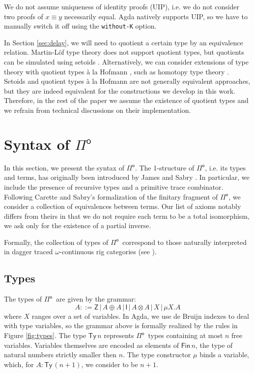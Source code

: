 \documentclass[runningheads,a4paper]{llncs}
\newcommand{\Pio}{\ensuremath{\mathsf{\Pi}^{\mathsf{o}}}}
\newcommand{\Ty}{\mathsf{Ty}}
\newcommand{\Z}{\mathsf{Z}}
\newcommand{\I}{\mathsf{I}}
\begin{document}
We do not assume uniqueness of identity proofs
(UIP), i.e. we do not consider two proofs of $x \equiv y$ necessarily
equal. Agda natively supports UIP, so we have to manually switch it
off using the \verb|without-K| option.

In Section \ref{sec:delay}, we will need to quotient a certain type by
an equivalence relation. Martin-L\"of type theory does not support
quotient types, but quotients can be simulated using setoids
\cite{BartheCP03}. Alternatively, we can consider extensions of type theory with
quotient types \`a la Hofmann \cite{Hofmann}, such as homotopy type
theory \cite{Hott}. Setoids and quotient types \`a la
Hofmann are not generally equivalent approaches, but they are indeed
equivalent for the constructions we develop in this work. Therefore,
in the rest of the paper we assume the existence of quotient types and
we refrain from technical discussions on their implementation.


\section{Syntax of \Pio}\label{sec:syntax}

In this section, we present the syntax of \Pio. The 1-structure of
\Pio, i.e. its types and terms, has originally been introduced by James
and Sabry \cite{JamesS12}. In particular, we include the presence of
recursive types and a primitive trace combinator.  Following Carette
and Sabry's formalization of the finitary fragment of \Pio, we
consider a collection of equivalences between terms. Our list of
axioms notably differs from theirs in that we do not require each term to be
a total isomorphism, we ask only for the existence of a partial
inverse. 

Formally, the collection of types of \Pio\ correspond to those naturally
interpreted in dagger traced $\omega$-continuous rig categories (see
\cite{Karvonen19}).

\subsection{Types}

The types of \Pio\ are given by the grammar:
\[
A ::= \Z \, | \,A \oplus A \, | \,\I \,| \,A \otimes A \,| \,X \,|
\,\mu X.A 
\]
where $X$ ranges over a set of variables. In Agda, we use de Bruijn
indexes to deal with type variables, so the grammar above is formally
realized by the rules in Figure \ref{fig:types}. The type $\Ty\,n$
represents \Pio\ types containing at most $n$ free
variables. Variables themselves are encoded as elements of
$\mathsf{Fin}\,n$, the type of natural numbers strictly smaller then
$n$. The type constructor $\mu$ binds a variable, which, for $A : \Ty\,(n +
1)$, we consider to be $n + 1$.
\end{document}
